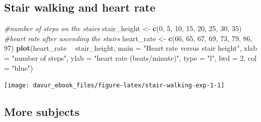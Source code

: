 \documentclass[]{book}
\newenvironment{Shaded}{\begin{snugshade}}{\end{snugshade}}
\newcommand{\CommentTok}[1]{\textcolor[rgb]{0.56,0.35,0.01}{\textit{#1}}}
\newcommand{\DataTypeTok}[1]{\textcolor[rgb]{0.13,0.29,0.53}{#1}}
\newcommand{\DecValTok}[1]{\textcolor[rgb]{0.00,0.00,0.81}{#1}}
\newcommand{\KeywordTok}[1]{\textcolor[rgb]{0.13,0.29,0.53}{\textbf{#1}}}
\newcommand{\NormalTok}[1]{#1}
\newcommand{\OperatorTok}[1]{\textcolor[rgb]{0.81,0.36,0.00}{\textbf{#1}}}
\newcommand{\StringTok}[1]{\textcolor[rgb]{0.31,0.60,0.02}{#1}}
\begin{document}
\hypertarget{stair-walking-and-heart-rate-1}{%
\subsection{Stair walking and heart rate}\label{stair-walking-and-heart-rate-1}}

\begin{Shaded}
\begin{Highlighting}[]
\CommentTok{#number of steps on the stairs}
\NormalTok{stair_height <-}\StringTok{ }\KeywordTok{c}\NormalTok{(}\DecValTok{0}\NormalTok{, }\DecValTok{5}\NormalTok{, }\DecValTok{10}\NormalTok{, }\DecValTok{15}\NormalTok{, }\DecValTok{20}\NormalTok{, }\DecValTok{25}\NormalTok{, }\DecValTok{30}\NormalTok{, }\DecValTok{35}\NormalTok{)}
\CommentTok{#heart rate after ascending the stairs}
\NormalTok{heart_rate <-}\StringTok{ }\KeywordTok{c}\NormalTok{(}\DecValTok{66}\NormalTok{, }\DecValTok{65}\NormalTok{, }\DecValTok{67}\NormalTok{, }\DecValTok{69}\NormalTok{, }\DecValTok{73}\NormalTok{, }\DecValTok{79}\NormalTok{, }\DecValTok{86}\NormalTok{, }\DecValTok{97}\NormalTok{)}
\KeywordTok{plot}\NormalTok{(heart_rate }\OperatorTok{~}\StringTok{ }\NormalTok{stair_height,}
      \DataTypeTok{main =} \StringTok{"Heart rate versus stair height"}\NormalTok{,}
      \DataTypeTok{xlab =} \StringTok{"number of steps"}\NormalTok{,}
      \DataTypeTok{ylab =} \StringTok{"heart rate (beats/minute)"}\NormalTok{,}
      \DataTypeTok{type =} \StringTok{"l"}\NormalTok{,}
      \DataTypeTok{lwd =} \DecValTok{2}\NormalTok{,}
      \DataTypeTok{col =} \StringTok{"blue"}\NormalTok{)}
\end{Highlighting}
\end{Shaded}

\begin{center}\texttt{[image: davur\_ebook\_files/figure-latex/stair-walking-exp-1-1]} \end{center}

\hypertarget{more-subjects-1}{%
\subsection{More subjects}\label{more-subjects-1}}
\end{document}
